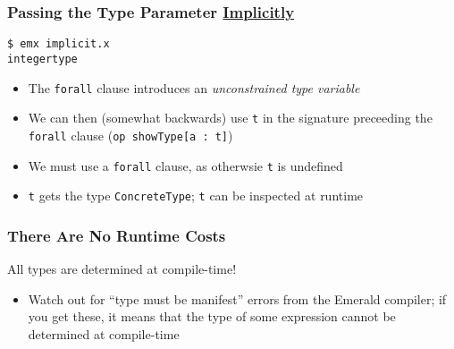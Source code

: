 \begin{frame}[fragile]

\frametitle{Passing the Type Parameter \underline{Implicitly}}


\begin{lstlisting}
$ emx implicit.x
integertype
\end{lstlisting}

\begin{itemize}

\item The \lstinline{forall} clause introduces an \emph{unconstrained
type variable}

\item We can then (somewhat backwards) use \lstinline{t} in the
signature preceeding the \lstinline{forall} clause
(\lstinline{op showType[a : t]})

\item We must use a \lstinline{forall} clause, as otherwsie
\lstinline{t} is undefined \frownie{}

\item \lstinline{t} gets the type \lstinline{ConcreteType};
\lstinline{t} can be inspected at runtime

\end{itemize}

\end{frame}

\begin{frame}[fragile]

\frametitle{There Are No Runtime Costs}

\vspace{\fill}

\begin{center}
All types are determined at compile-time!
\end{center}

\vspace{\fill}

\begin{itemize}

\item Watch out for ``type must be manifest'' errors from the Emerald
compiler; if you get these, it means that the type of some expression
cannot be determined at compile-time

\end{itemize}

\end{frame}

